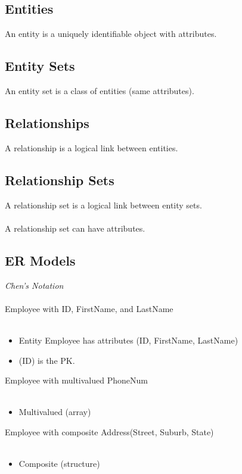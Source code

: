 \documentclass[12pt, a4paper]{article}
\begin{document}
    \subsection{Entities}
    An entity is a uniquely identifiable object with attributes. 

    \subsection{Entity Sets}
    An entity set is a class of entities (same attributes). 

    \subsection{Relationships}
    A relationship is a logical link between entities. 

    \subsection{Relationship Sets}
    A relationship set is a logical link between entity sets. \\\\
    A relationship set can have attributes. 

    \subsection{ER Models}
    \emph{Chen's Notation} \\\\ 

    Employee with ID, FirstName, and LastName \\\\ 
    \begin{itemize}
        \item Entity Employee has attributes (ID, FirstName, LastName) 
        \item (ID) is the PK. 
    \end{itemize}

    Employee with multivalued PhoneNum \\\\ 
    \begin{itemize}
        \item Multivalued (array) 
    \end{itemize}

    Employee with composite Address(Street, Suburb, State) \\\\ 
    \begin{itemize}
        \item Composite (structure) 
    \end{itemize}
\end{document}
